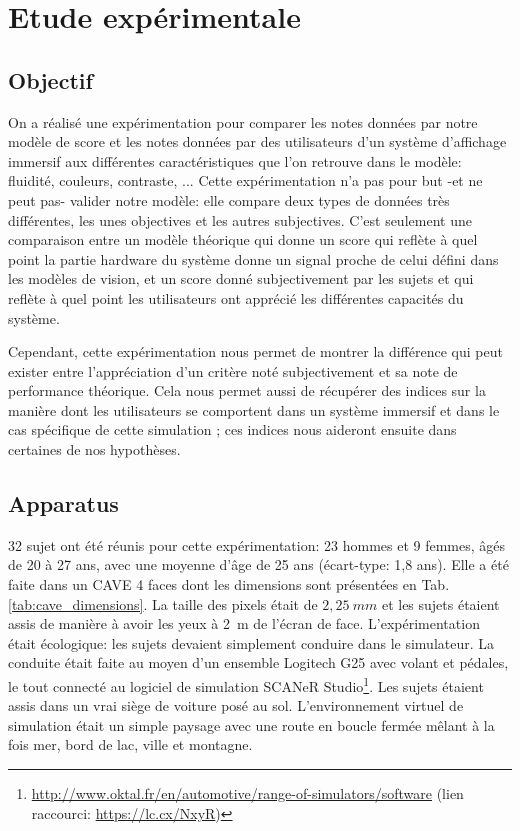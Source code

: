 \chapter{Etude expérimentale}
\label{chap:sdr_etude_experimentale}
	\section{Objectif}
		\par On a réalisé une expérimentation pour comparer les notes données par notre modèle de score et les notes données par des utilisateurs d'un système d'affichage immersif aux différentes caractéristiques que l'on retrouve dans le modèle: fluidité, couleurs, contraste, ... Cette expérimentation n'a pas pour but -et ne peut pas- valider notre modèle: elle compare deux types de données très différentes, les unes objectives et les autres subjectives. C'est seulement une comparaison entre un modèle théorique qui donne un score qui reflète à quel point la partie hardware du système donne un signal proche de celui défini dans les modèles de vision, et un score donné subjectivement par les sujets et qui reflète à quel point les utilisateurs ont apprécié les différentes capacités du système.
		
		\par Cependant, cette expérimentation nous permet de montrer la différence qui peut exister entre l'appréciation d'un critère noté subjectivement et sa note de performance théorique. Cela nous permet aussi de récupérer des indices sur la manière dont les utilisateurs se comportent dans un système immersif et dans le cas spécifique de cette simulation ; ces indices nous aideront ensuite dans certaines de nos hypothèses.
		
	\section{Apparatus}
	\par 32 sujet ont été réunis pour cette expérimentation: 23 hommes et 9 femmes, âgés de 20 à 27 ans, avec une moyenne d'âge de 25 ans (écart-type: 1,8 ans). Elle a été faite dans un CAVE 4 faces dont les dimensions sont présentées en Tab. \ref{tab:cave_dimensions}. La taille des pixels était de $2,25~mm$ et les sujets étaient assis de manière à avoir les yeux à 2~m de l'écran de face. L'expérimentation était écologique: les sujets devaient simplement conduire dans le simulateur. La conduite était faite au moyen d'un ensemble Logitech G25 avec volant et pédales, le tout connecté au logiciel de simulation SCANeR Studio\footnote{\url{http://www.oktal.fr/en/automotive/range-of-simulators/software} (lien raccourci: \url{https://lc.cx/NxyR})}. Les sujets étaient assis dans un vrai siège de voiture posé au sol. L'environnement virtuel de simulation était un simple paysage avec une route en boucle fermée mêlant à la fois mer, bord de lac, ville et montagne.
	 
